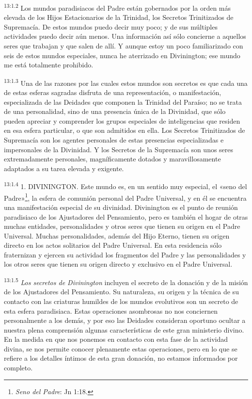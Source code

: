 \par
\textsuperscript{13:1.2} Los mundos paradisiacos del Padre están gobernados por la orden más elevada de los Hijos Estacionarios de la Trinidad, los Secretos Trinitizados de Supremacía. De estos mundos puedo decir muy poco; y de sus múltiples actividades puedo decir aún menos. Una información así sólo concierne a aquellos seres que trabajan y que salen de allí. Y aunque estoy un poco familiarizado con seis de estos mundos especiales, nunca he aterrizado en Divinington; ese mundo me está totalmente prohibido.

\par
\textsuperscript{13:1.3} Una de las razones por las cuales estos mundos son secretos es que cada una de estas esferas sagradas disfruta de una representación, o manifestación, especializada de las Deidades que componen la Trinidad del Paraíso; no se trata de una personalidad, sino de una presencia única de la Divinidad, que sólo pueden apreciar y comprender los grupos especiales de inteligencias que residen en esa esfera particular, o que son admitidos en ella. Los Secretos Trinitizados de Supremacía son los agentes personales de estas presencias especializadas e impersonales de la Divinidad. Y los Secretos de la Supremacía son unos seres extremadamente personales, magníficamente dotados y maravillosamente adaptados a su tarea elevada y exigente.

\par
\textsuperscript{13:1.4} 1. DIVININGTON. Este mundo es, en un sentido muy especial, el «seno del Padre»\footnote{\textit{Seno del Padre}: Jn 1:18.}, la esfera de comunión personal del Padre Universal, y en él se encuentra una manifestación especial de su divinidad. Divinington es el punto de reunión paradisiaco de los Ajustadores del Pensamiento, pero es también el hogar de otras muchas entidades, personalidades y otros seres que tienen su origen en el Padre Universal. Muchas personalidades, además del Hijo Eterno, tienen su origen directo en los actos solitarios del Padre Universal. En esta residencia sólo fraternizan y ejercen su actividad los fragmentos del Padre y las personalidades y los otros seres que tienen su origen directo y exclusivo en el Padre Universal.

\par
\textsuperscript{13:1.5} \textit{Los secretos de Divinington} incluyen el secreto de la donación y de la misión de los Ajustadores del Pensamiento. Su naturaleza, su origen y la técnica de su contacto con las criaturas humildes de los mundos evolutivos son un secreto de esta esfera paradisiaca. Estas operaciones asombrosas no nos conciernen personalmente a los demás, y por eso las Deidades consideran oportuno ocultar a nuestra plena comprensión algunas características de este gran ministerio divino. En la medida en que nos ponemos en contacto con esta fase de la actividad divina, se nos permite conocer plenamente estas operaciones, pero en lo que se refiere a los detalles íntimos de esta gran donación, no estamos informados por completo.


